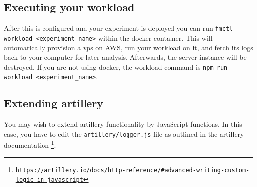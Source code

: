 \documentclass[../main.tex]{subfiles}
\begin{document}
\subsection{Executing your workload}

After this is configured and your experiment is deployed you can run \texttt{fmctl workload <experiment\_name>} 
within the docker container. This will automatically provision a vps on AWS, run your workload on it, and
fetch its logs back to your computer for later analysis. Afterwards, the server-instance will be destroyed.
If you are not using docker, the workload command is \texttt{npm run workload <experiment\_name>}.

\subsection{Extending artillery}

You may wish to extend artillery functionality by JavaScript functions.
In this case, you have to edit the \texttt{artillery/logger.js} file as outlined in the artillery documentation%
\footnote{\href{https://artillery.io/docs/http-reference}%
{\texttt{https://artillery.io/docs/http-reference/\#advanced-writing-custom-logic-in-javascript}}}.
\end{document}
